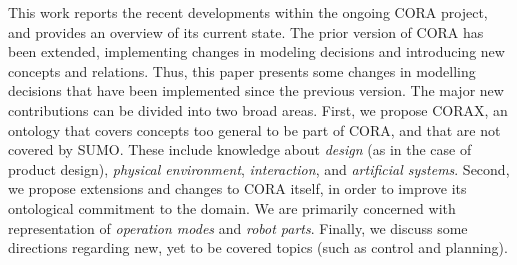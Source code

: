 \documentclass[preprint,12pt]{elsarticle}
\newcommand{\hlc}[2][yellow]{ {\sethlcolor{#1} \hl{#2}} }
\newcommand{\joel}[1]{{\hlc[green]{\textbf{Joel}: #1}}}
\begin{document}
This work reports the recent developments within the ongoing CORA project, and provides an overview of its current state. The prior version of CORA \cite{prestes2013towards} has been extended, implementing changes in modeling decisions and introducing new concepts and relations. Thus, this paper presents some changes in modelling decisions that have been implemented since the previous version. The major new contributions can be divided into two broad areas. First, we propose CORAX, an ontology that covers concepts  too general to be part of CORA, and that are not covered by SUMO. These  include knowledge about \emph{design} (as in the case of product design), \emph{physical environment}, \emph{interaction}, and \emph{artificial systems}. Second, we propose extensions and changes to CORA itself, in order to improve its ontological commitment to the domain. We are primarily concerned with representation of \emph{operation modes} and \emph{robot parts}. Finally, we discuss some directions regarding new, yet to be covered topics (such as control and planning).





\end{document}
